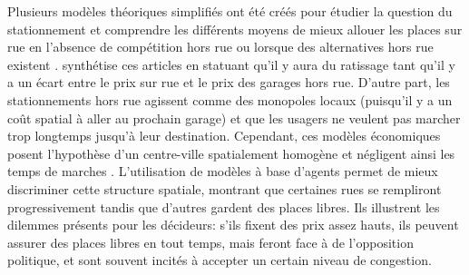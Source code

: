         Plusieurs modèles théoriques simplifiés ont été créés pour étudier la question du stationnement et comprendre les différents moyens de mieux allouer les places sur rue en l'absence de compétition hors rue \parencite{anderson_economics_2004,arnott_integrated_2006,arnott_stability_2010} ou lorsque des alternatives hors rue existent \parencite{calthrop_regulating_2006,arnott_downtown_2009,arnott_spatial_2006}. \textcite{inci_review_2015} synthétise ces articles en statuant qu'il y aura du ratissage tant qu'il y a un écart entre le prix sur rue et le prix des garages hors rue. D'autre part, les stationnements hors rue agissent comme des monopoles locaux (puisqu'il y a un coût spatial à aller au prochain garage) et que les usagers ne veulent pas marcher trop longtemps jusqu'à leur destination. Cependant, ces modèles économiques posent l'hypothèse d'un centre-ville spatialement homogène et négligent ainsi les temps de marches \parencite{martens_dilemma_2010}. L'utilisation de modèles à base d'agents \parencite{benenson_parkagent_2008,martens_dilemma_2010} permet de mieux discriminer cette structure spatiale, montrant que certaines rues se rempliront progressivement tandis que d'autres gardent des places libres. Ils illustrent les dilemmes présents pour les décideurs: s'ils fixent des prix assez hauts, ils peuvent assurer des places libres en tout temps, mais feront face à de l'opposition politique, et sont souvent incités à accepter un certain niveau de congestion.\par

